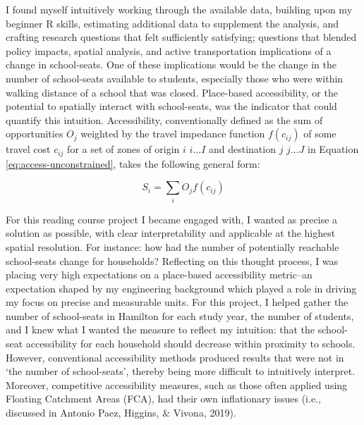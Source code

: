 \documentclass[
11pt, %
oneside, %
english, %
singlespacing, %
]{macthesis} %
\begin{document}
I found myself intuitively working through the available data, building upon my beginner R skills, estimating additional data to supplement the analysis, and crafting research questions that felt sufficiently satisfying; questions that blended policy impacts, spatial analysis, and active transportation implications of a change in school-seats. One of these implications would be the change in the number of school-seats available to students, especially those who were within walking distance of a school that was closed. Place-based accessibility, or the potential to spatially interact with school-seats, was the indicator that could quantify this intuition. Accessibility, conventionally defined as the sum of opportunities \(O_j\) weighted by the travel impedance function \(f(c_{ij})\) of some travel cost \(c_{ij}\) for a set of zones of origin \(i\) \(i...I\) and destination \(j\) \(j...J\) in Equation \ref{eq:access-unconstrained}, takes the following general form:

\begin{equation}
\label{eq:access-unconstrained}
S_i = \sum_i O_j f(c_{ij}) 
\end{equation} 

For this reading course project I became engaged with, I wanted as precise a solution as possible, with clear interpretability and applicable at the highest spatial resolution. For instance: how had the number of potentially reachable school-seats change for households? Reflecting on this thought process, I was placing very high expectations on a place-based accessibility metric--an expectation shaped by my engineering background which played a role in driving my focus on precise and measurable units. For this project, I helped gather the number of school-seats in Hamilton for each study year, the number of students, and I knew what I wanted the measure to reflect my intuition: that the school-seat accessibility for each household should decrease within proximity to schools. However, conventional accessibility methods produced results that were not in `the number of school-seats', thereby being more difficult to intuitively interpret. Moreover, competitive accessibility measures, such as those often applied using Floating Catchment Areas (FCA), had their own inflationary issues (i.e., discussed in Antonio Paez, Higgins, \& Vivona, 2019).
\end{document}
